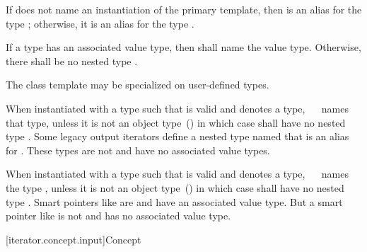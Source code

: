 \begin{addedblock}
\pnum
If  does not name an instantiation of the primary
template, then  is an
alias for the type ; otherwise, it is an
alias for the type .
\end{addedblock}

\pnum
If a type  has an associated value type, then
shall name the value type. Otherwise, there shall be no nested type
.

\pnum
The  class template may be
specialized on user-defined types.

\pnum
When instantiated with a type 
such that  is valid and denotes a type,
\ \ 
names that type, unless it is not an object type~() in which case
shall have no nested type . \enternote Some legacy output
iterators define a nested type named  that is an alias for . These
types are not  and have no associated value types.\exitnote

\pnum
When instantiated with a type 
such that  is valid and denotes a type,
\ \ 
names the type , unless it is
not an object type~() in which case
 shall have no nested
type . \enternote Smart pointers like
 are  and have an associated value type.
But a smart pointer like  is not  and
has no associated value type.\exitnote


\setcounter{subsubsection}{10}
[iterator.concept.input]{Concept }



